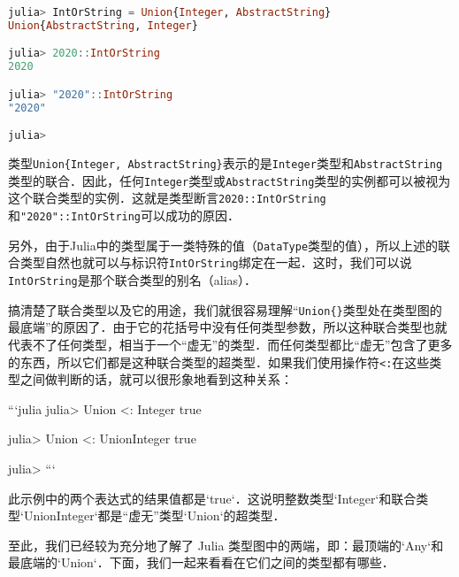 \begin{lstlisting}[language=julia]
julia> IntOrString = Union{Integer, AbstractString} 
Union{AbstractString, Integer}

julia> 2020::IntOrString
2020

julia> "2020"::IntOrString
"2020"

julia> 
\end{lstlisting}

类型\verb|Union{Integer, AbstractString}|表示的是\verb|Integer|类型和\verb|AbstractString|类型的联合．因此，任何\verb|Integer|类型或\verb|AbstractString|类型的实例都可以被视为这个联合类型的实例．这就是类型断言\verb|2020::IntOrString|和\verb|"2020"::IntOrString|可以成功的原因．

另外，由于Julia中的类型属于一类特殊的值（\verb|DataType|类型的值），所以上述的联合类型自然也就可以与标识符\verb|IntOrString|绑定在一起．这时，我们可以说\verb|IntOrString|是那个联合类型的别名（alias）．

搞清楚了联合类型以及它的用途，我们就很容易理解“\verb|Union{}|类型处在类型图的最底端”的原因了．由于它的花括号中没有任何类型参数，所以这种联合类型也就代表不了任何类型，相当于一个“虚无”的类型．而任何类型都比“虚无”包含了更多的东西，所以它们都是这种联合类型的超类型．如果我们使用操作符\verb|<:|在这些类型之间做判断的话，就可以很形象地看到这种关系：

```julia
julia> Union{} <: Integer
true

julia> Union{} <: Union{Integer}
true

julia> 
```

此示例中的两个表达式的结果值都是`true`．这说明整数类型`Integer`和联合类型`Union{Integer}`都是“虚无”类型`Union{}`的超类型．

至此，我们已经较为充分地了解了 Julia 类型图中的两端，即：最顶端的`Any`和最底端的`Union{}`．下面，我们一起来看看在它们之间的类型都有哪些．